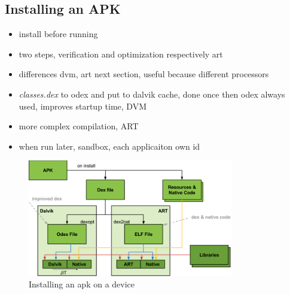 \subsection{Installing an APK} \label{subsection:android-install}
\begin{itemize}
  \item install before running
  \item two steps, verification and optimization respectively art
  \item differences dvm, art next section, useful because different processors
  \item \textit{classes.dex} to odex and put to dalvik cache, done once then odex always used, improves startup time, DVM
  \item more complex compilation, ART
  \item when run later, sandbox, each applicaiton own id
\end{itemize}
\begin{figure}[h]
    \centering
    \includegraphics[width=0.8\textwidth]{data/install.png}
    \caption{Installing an \gls{apk} on a device \cite{googleIOArt}}
    \label{fig:install}
\end{figure}
